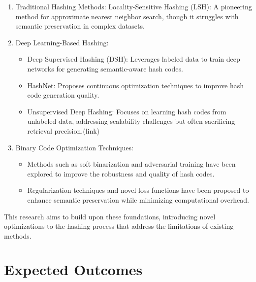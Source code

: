 \documentclass[conference]{IEEEtran}
\begin{document}
\begin{enumerate}
    \item Traditional Hashing Methods: Locality-Sensitive Hashing (LSH): A pioneering method for approximate nearest neighbor search, though it struggles with semantic preservation in complex datasets.
    \item Deep Learning-Based Hashing:
    \begin{itemize}
        \item Deep Supervised Hashing (DSH): Leverages labeled data to train deep networks for generating semantic-aware hash codes. 

        \item HashNet: Proposes continuous optimization techniques to improve hash code generation quality. 

        \item Unsupervised Deep Hashing: Focuses on learning hash codes from unlabeled data, addressing scalability challenges but often sacrificing retrieval precision.(link)
        
        
    \end{itemize}
    \item Binary Code Optimization Techniques:
    \begin{itemize}
        \item Methods such as soft binarization and adversarial training have been explored to improve the robustness and quality of hash codes.
        \item Regularization techniques and novel loss functions have been proposed to enhance semantic preservation while minimizing computational overhead.
        
    \end{itemize}
\end{enumerate}

This research aims to build upon these foundations, introducing novel optimizations to the hashing process that address the limitations of existing methods.

\section{Expected Outcomes}
\end{document}

